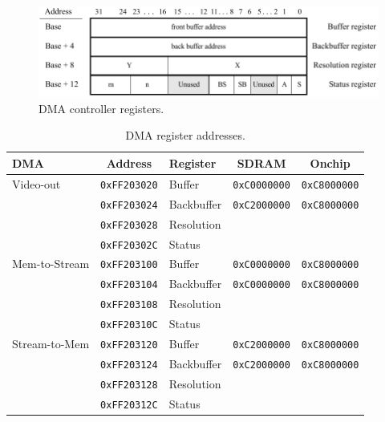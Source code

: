 \documentclass[epsfig,10pt,fullpage]{article}
\begin{document}
\clearpage
\newpage
\begin{figure}[h!]
   \begin{center}
       \includegraphics{figures/fig_DMA_ctrl.pdf}
   \end{center}
   \caption{DMA controller registers.}
	\label{fig:pixel_ctrl}
\end{figure}

\begin{table}[h]
\begin{center}
\begin{tabular}{l|c|l|c|c}
\textbf{DMA} & \textbf{Address} & \textbf{Register} & \textbf{SDRAM} & \textbf{Onchip}\\ \hline
 \rule{0cm}{12pt}Video-out & \texttt{0xFF203020} & Buffer & \texttt{0xC0000000} & \texttt{0xC8000000} \\
 & \texttt{0xFF203024} & Backbuffer & \texttt{0xC2000000} & \texttt{0xC8000000} \\
 & \texttt{0xFF203028} & Resolution &  & \\
 & \texttt{0xFF20302C} & Status &  & \\ \hline
 \rule{0cm}{12pt}Mem-to-Stream & \texttt{0xFF203100} & Buffer & \texttt{0xC0000000}
 & \texttt{0xC8000000} \\
 & \texttt{0xFF203104} & Backbuffer & \texttt{0xC0000000} & \texttt{0xC8000000} \\
 & \texttt{0xFF203108} & Resolution &  & \\
 & \texttt{0xFF20310C} & Status & & \\ \hline
 \rule{0cm}{12pt}Stream-to-Mem & \texttt{0xFF203120} & Buffer & \texttt{0xC2000000}
 & \texttt{0xC8000000} \\
 & \texttt{0xFF203124} & Backbuffer & \texttt{0xC2000000} & \texttt{0xC8000000} \\
 & \texttt{0xFF203128} & Resolution &  & \\
 & \texttt{0xFF20312C} & Status &  & \\
\end{tabular}
\caption{DMA register addresses.}
\label{tab:DMA_addr}
\end{center}
\end{table}
\end{document}
